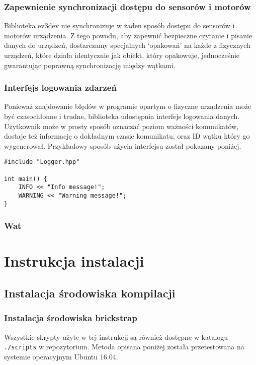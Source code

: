 \documentclass{article}
\begin{document}
\subsubsection*{Zapewnienie synchronizacji dostępu do sensorów i motorów}
Biblioteka ev3dev nie synchronizuje w żaden sposób dostępu do sensorów i motorów
urządzenia. Z tego powodu, aby zapewnić bezpieczne czytanie i pisanie danych do
urządzeń, dostarczamy specjalnych `opakowań' na każde z fizycznych urządzeń,
które działa identycznie jak obiekt, który opakowuje, jednocześnie gwarantując
poprawną synchronizację między wątkami.
\subsubsection*{Interfejs logowania zdarzeń}
Ponieważ znajdowanie błędów w programie opartym o fizyczne urządzenia może być
czasochłonne i trudne, biblioteka udostępnia interfejs logowania danych.
Użytkownik może w prosty sposób oznaczać poziom ważności komunikatów, dostaje
też informację o dokładnym czasie komunikatu, oraz ID wątku który go
wygenerował. Przykładowy sposób użycia interfejsu został pokazany poniżej.
\begin{lstlisting}
#include "Logger.hpp"

int main() {
    INFO << "Info message!";
    WARNING << "Warning message!";
}
\end{lstlisting}
\subsubsection*{Wat}
\section{Instrukcja instalacji}
\subsection{Instalacja środowiska kompilacji}
\subsubsection*{Instalacja środowiska brickstrap}\label{instr_brickstrap}
Wszystkie skrypty użyte w tej instrukcji są również dostępne w katalogu
\texttt{./scripts} w repozytorium. Metoda opisana poniżej została
przetestowana na systemie operacyjnym Ubuntu 16.04.
\end{document}
